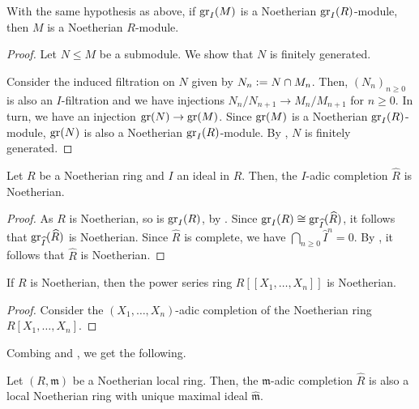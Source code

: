 \begin{cor} \label{cor:gr-M-noetherian-implies-M-noetherian}
	With the same hypothesis as above, if $\operatorname{gr}_{I}(M)$ is a Noetherian $\operatorname{gr}_{I}(R)$-module, then $M$ is a Noetherian $R$-module.
\end{cor}
\begin{proof} 
	Let $N \le M$ be a submodule. We show that $N$ is finitely generated.

	Consider the induced filtration on $N$ given by $N_{n} \vcentcolon= N \cap M_{n}$. Then, $(N_{n})_{n \ge 0}$ is also an $I$-filtration and we have injections $N_{n}/N_{n + 1} \to M_{n}/M_{n + 1}$ for $n \ge 0$. In turn, we have an injection $\operatorname{gr}(N) \to \operatorname{gr}(M)$. Since $\operatorname{gr}(M)$ is a Noetherian $\operatorname{gr}_{I}(R)$-module, $\operatorname{gr}(N)$ is also a Noetherian $\operatorname{gr}_{I}(R)$-module. By , $N$ is finitely generated.
\end{proof}

\begin{cor} \label{cor:completion-noetherian-is-noetherian}
	Let $R$ be a Noetherian ring and $I$ an ideal in $R$. Then, the $I$-adic completion $\widehat{R}$ is Noetherian.
\end{cor}
\begin{proof} 
	As $R$ is Noetherian, so is $\operatorname{gr}_{I}(R)$, by . Since $\operatorname{gr}_{I}(R) \cong \operatorname{gr}_{\widehat{I}}(\widehat{R})$, it follows that $\operatorname{gr}_{\widehat{I}}(\widehat{R})$ is Noetherian. Since $\widehat{R}$ is complete, we have $\bigcap_{n \ge 0} \widehat{I}^{n} = 0$. By , it follows that $\widehat{R}$ is Noetherian.
\end{proof}

\begin{cor}
	If $R$ is Noetherian, then the power series ring $R[\![X_{1}, \ldots, X_{n}]\!]$ is Noetherian.
\end{cor}
\begin{proof} 
	Consider the $(X_{1}, \ldots, X_{n})$-adic completion of the Noetherian ring $R[X_{1}, \ldots, X_{n}]$.	
\end{proof}

Combing  and , we get the following.

\begin{cor}
	Let $(R, \mathfrak{m})$ be a Noetherian local ring. Then, the $\mathfrak{m}$-adic completion $\widehat{R}$ is also a local Noetherian ring with unique maximal ideal $\widehat{\mathfrak{m}}$.
\end{cor}

